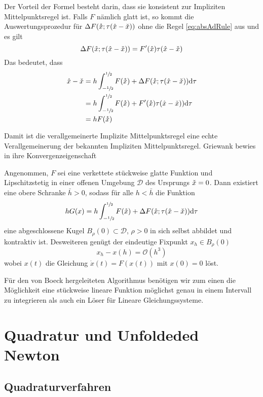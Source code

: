 Der Vorteil der Formel besteht darin, dass sie konsistent zur Impliziten Mittelpunktsregel ist. Falls $F$ nämlich glatt ist, so kommt die Auswertungsprozedur für $\Delta F(\mathring{x};\tau (\hat{x} - \check{x}))$ ohne die Regel \eqref{eq:absAdRule} aus und es gilt 
\[
 \Delta F(\mathring{x};\tau (\hat{x} - \check{x})) = F'(\mathring{x}) \tau (\hat{x} - \check{x})
\]
Das bedeutet, dass
\begin{equation}
\begin{aligned}
   \hat{x} -  \check{x} &= h\int_{-\sfrac{1}{2}}^{\sfrac{1}{2}} F(\mathring{x}) + \Delta F(\mathring{x};\tau (\hat{x} - \check{x}))  \text{d}\tau\\
		    &= h\int_{-\sfrac{1}{2}}^{\sfrac{1}{2}} F(\mathring{x}) + F'(\mathring{x})\tau (\hat{x} - \check{x}))  \text{d}\tau\\
		    &= h F(\mathring{x})
\end{aligned}
\label{eq:equivalenceGenImplMidpoint}
\end{equation}

Damit ist die verallgemeinerte Implizite Mittelpunktsregel eine echte Verallgemeinerung der bekannten Impliziten Mittelpunktsregel. 
Griewank bewies in \cite[Prop.4]{monster} ihre Konvergenzeigenschaft
\begin{theorem}
 Angenommen, $F$ sei eine verkettete stückweise glatte Funktion und Lipschitzstetig in einer offenen Umgebung $\mathcal D$ des Ursprungs $\check{x} =0$. Dann existiert eine obere Schranke $\bar h>0$, sodass für alle $h<\bar h$ die Funktion 
 \[
    hG(x) = h\int_{-\sfrac{1}{2}}^{\sfrac{1}{2}} F(\mathring{x}) + \Delta F(\mathring{x};\tau (\hat{x} - \check{x}))  \text{d}\tau
 \] 
 eine abgeschlossene Kugel $B_\rho(0)\subset \mathcal D$, $\rho>0$ in sich selbst abbildet und kontraktiv ist.
 Desweiteren genügt der eindeutige Fixpunkt $x_h\in B_\rho(0)$
 \[
  x_h - x(h) = \mathcal O(h^3)
 \]
  wobei $x(t)$ die Gleichung $\dot x(t) = F(x(t))$ mit  $x(0)= 0$ löst.
\end{theorem}

Für den von Boeck \cite{boeck14} hergeleiteten Algorithmus benötigen wir zum einen die Möglichkeit eine stückweise lineare Funktion möglichst genau in einem Intervall zu integrieren als auch ein Löser für Lineare Gleichungssysteme.

\section{Quadratur und Unfoldeded Newton}
\subsection{Quadraturverfahren}

